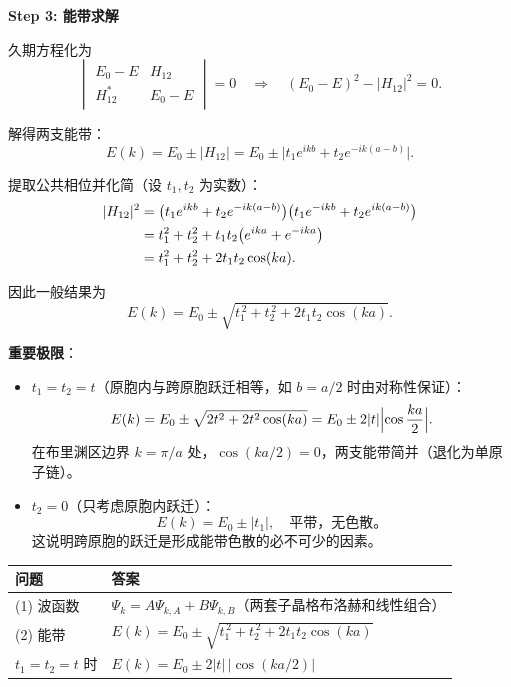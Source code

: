 \begin{derivationbox}[标准解题过程]
\textbf{Step 3: 能带求解}

久期方程化为
\begin{equation}
\begin{vmatrix}
E_0-E & H_{12} \\[4pt]
H_{12}^* & E_0-E
\end{vmatrix}=0
\quad\Longrightarrow\quad
(E_0-E)^2-|H_{12}|^2=0.
\end{equation}

解得两支能带：
\begin{equation}
E(k)=E_0\pm|H_{12}|=E_0\pm\bigl|t_1 e^{ikb}+t_2 e^{-ik(a-b)}\bigr|.
\end{equation}

提取公共相位并化简（设 $t_1,t_2$ 为实数）：
\begin{align}
|H_{12}|^2 &= \bigl(t_1 e^{ikb}+t_2 e^{-ik(a-b)}\bigr)\bigl(t_1 e^{-ikb}+t_2 e^{ik(a-b)}\bigr) \notag\\
&= t_1^2+t_2^2+t_1t_2\bigl(e^{ika}+e^{-ika}\bigr) \notag\\
&= t_1^2+t_2^2+2t_1t_2\cos(ka).
\end{align}

因此一般结果为
\begin{equation}
\boxed{E(k)=E_0\pm\sqrt{t_1^{\,2}+t_2^{\,2}+2t_1t_2\cos(ka)}.}
\end{equation}

\textbf{重要极限}：
\begin{itemize}
    \item \textbf{$t_1=t_2=t$}（原胞内与跨原胞跃迁相等，如 $b=a/2$ 时由对称性保证）：
    \begin{equation}
    E(k)=E_0\pm\sqrt{2t^2+2t^2\cos(ka)}=E_0\pm 2|t|\Bigl|\cos\frac{ka}{2}\Bigr|.
    \end{equation}
    在布里渊区边界 $k=\pi/a$ 处，$\cos(ka/2)=0$，两支能带简并（退化为单原子链）。
    \item \textbf{$t_2=0$}（只考虑原胞内跃迁）：
    \begin{equation}
    E(k)=E_0\pm|t_1|,\quad\text{平带，无色散。}
    \end{equation}
    这说明跨原胞的跃迁是形成能带色散的必不可少的因素。
\end{itemize}
\end{derivationbox}

\begin{formulabox}[答案汇总]
\begin{center}
\begin{tabular}{ll}
\toprule
\textbf{问题} & \textbf{答案} \\
\midrule
(1) 波函数 & $\Psi_k=A\Psi_{k,A}+B\Psi_{k,B}$（两套子晶格布洛赫和线性组合） \\
(2) 能带 & $E(k)=E_0\pm\sqrt{t_1^{\,2}+t_2^{\,2}+2t_1t_2\cos(ka)}$ \\
\quad $t_1=t_2=t$ 时 & $E(k)=E_0\pm 2|t|\,|\cos(ka/2)|$ \\
\bottomrule
\end{tabular}
\end{center}
\end{formulabox}

